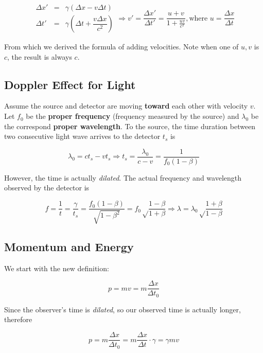 \documentclass[12pt,a4paper]{report}
\begin{document}
  \[ \begin{matrix} \Delta x' & = & \gamma (\Delta x - v\Delta t) \\ \Delta t' & = & \gamma \left(\Delta t + \dfrac{v\Delta x}{c^2}\right) \end{matrix} \Rightarrow v' = \frac{\Delta x'}{\Delta t'} = \frac{u + v}{1 + \frac{uv}{c^2}}, \text{where } u = \frac{\Delta x}{\Delta t} \]

  From which we derived the formula of adding velocities. Note when one of $u, v$ is $c$, the result is always $c$.

  \subsection*{Doppler Effect for Light}
  Assume the source and detector are moving \textbf{toward} each other with velocity $v$. Let $f_0$ be the \textbf{proper frequency} (frequency measured by the source) and $\lambda_0$ be the correspond \textbf{proper wavelength}. To the source, the time duration between two consecutive light wave arrives to the detector $t_s$ is
  
  \[ \lambda_0 = ct_s - vt_s \Rightarrow t_s = \frac{\lambda_0}{c-v} = \frac 1 {f_0 (1 - \beta)}\]

  However, the time is actually \textit{dilated}. The actual frequency and wavelength observed by the detector is

  \[ f = \frac 1 t = \frac{\gamma}{t_s} = \frac{f_0(1 - \beta)}{\sqrt{1 - \beta^2}} = f_0 \sqrt \frac{1 - \beta}{1 + \beta} \Rightarrow \lambda = \lambda_0 \sqrt \frac{1 + \beta}{1 - \beta} \]

  \subsection*{Momentum and Energy}

  We start with the new definition:  

  \[ p = mv = m \frac{\Delta x}{\Delta t_0} \]

  Since the observer's time is \textit{dilated}, so our observed time is actually longer, therefore 

  \[ p = m \frac{\Delta x}{\Delta t_0} = m \frac{\Delta x}{\Delta t} \cdot \gamma = \gamma mv \]
\end{document}
